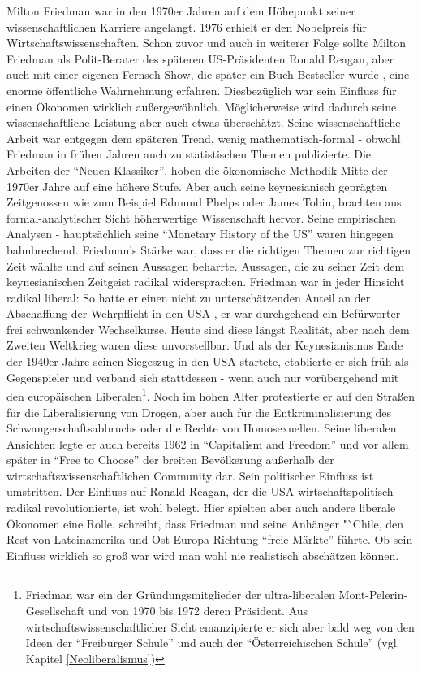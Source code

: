 Milton Friedman war in den 1970er Jahren auf dem Höhepunkt seiner wissenschaftlichen Karriere angelangt. 1976 erhielt er den Nobelpreis für Wirtschaftswissenschaften. Schon zuvor und auch in weiterer Folge sollte Milton Friedman als Polit-Berater des späteren US-Präsidenten Ronald Reagan, aber auch mit einer eigenen Fernseh-Show, die später ein Buch-Bestseller wurde \parencite{Friedman1980}, eine enorme öffentliche Wahrnehmung erfahren. Diesbezüglich war sein Einfluss für einen Ökonomen wirklich außergewöhnlich. Möglicherweise wird dadurch seine wissenschaftliche Leistung aber auch etwas überschätzt.
Seine wissenschaftliche Arbeit war entgegen dem späteren Trend, wenig mathematisch-formal - obwohl Friedman in frühen Jahren auch zu statistischen Themen publizierte.  Die Arbeiten der "`Neuen Klassiker"', hoben die ökonomische Methodik Mitte der 1970er Jahre auf eine höhere Stufe. Aber auch seine keynesianisch geprägten Zeitgenossen wie zum Beispiel Edmund Phelps oder James Tobin, brachten aus formal-analytischer Sicht höherwertige Wissenschaft hervor. Seine empirischen Analysen - hauptsächlich seine "`Monetary History of the US"' waren hingegen bahnbrechend.
Friedman's Stärke war, dass er die richtigen Themen zur richtigen Zeit wählte und auf seinen Aussagen beharrte. Aussagen, die zu seiner Zeit dem keynesianischen Zeitgeist radikal widersprachen. Friedman war in jeder Hinsicht radikal liberal: So hatte er einen nicht zu unterschätzenden Anteil an der Abschaffung der Wehrpflicht in den USA \textcite{Appelbaum2019}, er war durchgehend ein Befürworter frei schwankender Wechselkurse. Heute sind diese längst Realität, aber nach dem Zweiten Weltkrieg waren diese unvorstellbar. Und als der Keynesianismus Ende der 1940er Jahre seinen Siegeszug in den USA startete, etablierte er sich früh als Gegenspieler und verband sich stattdessen - wenn auch nur vorübergehend mit den europäischen Liberalen\footnote{Friedman war ein der Gründungsmitglieder der ultra-liberalen Mont-Pelerin-Gesellschaft und von 1970 bis 1972 deren Präsident. Aus wirtschaftswissenschaftlicher Sicht emanzipierte er sich aber bald weg von den Ideen der "`Freiburger Schule"' und auch der "`Österreichischen Schule"' (vgl. Kapitel \ref{Neoliberalismus})}. Noch im hohen Alter protestierte er auf den Straßen für die Liberalisierung von Drogen, aber auch für die Entkriminalisierung des Schwangerschaftsabbruchs oder die Rechte von Homosexuellen. Seine liberalen Ansichten legte er auch bereits 1962 in "`Capitalism and Freedom"' \parencite{Friedman1962} und vor allem später in "`Free to Choose"' \parencite{Friedman1980} der breiten Bevölkerung außerhalb der wirtschaftswissenschaftlichen Community dar. Sein politischer Einfluss ist umstritten. Der Einfluss auf Ronald Reagan, der die USA wirtschaftspolitisch radikal revolutionierte, ist wohl belegt. Hier spielten aber auch andere liberale Ökonomen eine Rolle. \textcite[S. 77]{Warsh} schreibt, dass Friedman und seine Anhänger "`Chile, den Rest von Lateinamerika und Ost-Europa Richtung "`freie Märkte"' führte. Ob sein Einfluss wirklich so groß war wird man wohl nie realistisch abschätzen können.


